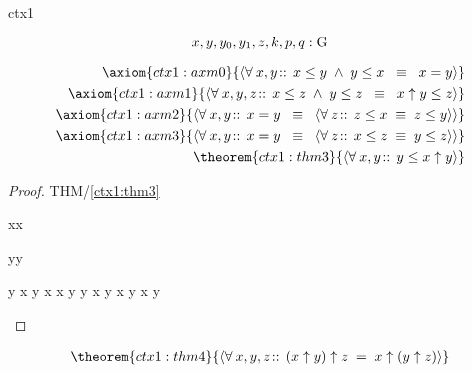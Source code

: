 \documentclass[12pt]{amsart}
\begin{document}
\begin{context}{ctx1}


\[ x,y,y_0,y_1,z,k,p,q: \text{G} \]

\precedence{[[\uparrow],[\le]]}
\begin{align}
\axiom{ctx1:axm0}{ 
	\qforall{x,y}{}{ x \le y \1\land y \le x \2\equiv x = y } } 
\\ \axiom{ctx1:axm1}{ 
	\qforall{x,y,z}{}{ x \le z \1\land y \le z \2\equiv 
		x \uparrow y \le z } }
\\ \axiom{ctx1:axm2}{ 
	\qforall{x,y}{}{ x = y \2\equiv \qforall{z}{}{ z \le x \1\equiv z \le y } } }
\\ \axiom{ctx1:axm3}{ 
	\qforall{x,y}{}{ x = y \2\equiv \qforall{z}{}{ x \le z \1\equiv y \le z } } }
\\ \theorem{ctx1:thm3}{ \qforall{x,y}{}{ y \le x \uparrow y } }
\end{align}

\begin{proof}{THM/\ref{ctx1:thm3}}
	\begin{free:var}{x}{x}
	\begin{free:var}{y}{y}
\begin{calculation}
		y \le x \uparrow y
		x \le x \uparrow y
	\2\land	y \le x \uparrow y
	\hint{=}{ \eqref{ctx1:axm1} }
		x \uparrow y \1\le x \uparrow y
	\hint{=}{ \eqref{ctx1:axm0} }
		\true
\end{calculation}
	\end{free:var}
	\end{free:var}
\end{proof}

\begin{align}
\theorem{ctx1:thm4}{ \qforall{x,y,z}{}{ (x \uparrow y) \uparrow z \1= x \uparrow (y \uparrow z) } }
\end{align}


\end{context}
\end{document}
